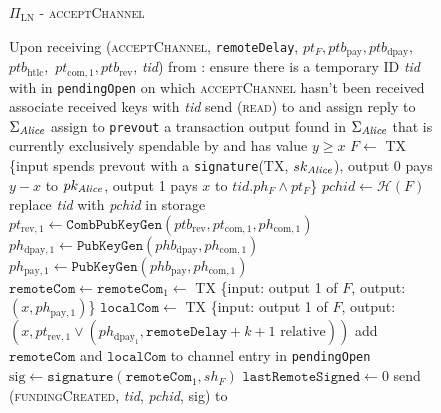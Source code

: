 \begin{figure}[!htbp]
\begin{protocolbox}{$\Pi_{\mathrm{LN}}$ - \textsc{acceptChannel}}
  \begin{algorithmic}[1]
    \State Upon receiving (\textsc{acceptChannel}, \texttt{remoteDelay}, $pt_F,
    ptb_{\mathrm{pay}}, ptb_{\mathrm{dpay}},$ $ptb_{\mathrm{htlc}},$
    $pt_{\mathrm{com}, 1}, ptb_{\mathrm{rev}}$, \textit{tid}) from \bob:
    \Indent
      \State ensure there is a temporary ID \textit{tid} with \bob{} in
      \texttt{pendingOpen} on which \textsc{acceptChannel} hasn't been received
      \State associate received keys with \textit{tid}
      \State send (\textsc{read}) to \ledger{} and assign reply to
      $\Sigma_{\mathit{Alice}}$
      \State assign to \texttt{prevout} a transaction output found in
      $\Sigma_{\mathit{Alice}}$ that is currently exclusively spendable by \alice{} and
      has value $y \geq x$
      \State $F \gets$ TX \{input spends prevout with a \texttt{signature}(TX,
      $sk_{\mathit{Alice}}$), output 0 pays $y - x$ to $pk_{\mathit{Alice}}$, output 1 pays $x$
      to $\textit{tid}.ph_F \wedge pt_F$\}
      \State $\mathit{pchid} \gets \mathcal{H}\left(F\right)$
      \State replace \textit{tid} with \textit{pchid} in storage
      \State $pt_{\mathrm{rev}, 1} \gets
      \mathtt{CombPubKeyGen}\left(ptb_{\mathrm{rev}}, pt_{\mathrm{com}, 1},
      ph_{\mathrm{com}, 1}\right)$
      \State $ph_{\mathrm{dpay}, 1} \gets
      \texttt{PubKeyGen}\left(phb_{\mathrm{dpay}}, ph_{\mathrm{com}, 1}\right)$
      \State $ph_{\mathrm{pay}, 1} \gets
      \texttt{PubKeyGen}\left(phb_{\mathrm{pay}}, ph_{\mathrm{com}, 1}\right)$
      \State $\mathtt{remoteCom} \gets \mathtt{remoteCom}_1 \gets$ TX \{input:
      output 1 of $F$, output: $\left(x, ph_{\mathrm{pay}, 1}\right)$\}
      \State $\mathtt{localCom} \gets$ TX \{input: output 1 of $F$, output:
      $\left(x, pt_{\mathrm{rev}, 1} \vee \left(ph_{\mathrm{dpay}_1},
      \mathtt{remoteDelay} + k + 1 \text{ relative}\right)\right)$
      \State add $\mathtt{remoteCom}$ and $\mathtt{localCom}$ to channel entry
      in \texttt{pendingOpen}
      \State $\mathrm{sig} \gets \mathtt{signature}\left(\mathtt{remoteCom}_1,
      sh_F\right)$
      \State $\mathtt{lastRemoteSigned} \gets 0$
      \State send (\textsc{fundingCreated}, \textit{tid},
      \textit{pchid}, sig) to \bob{}
    \EndIndent
  \end{algorithmic}
\end{protocolbox}
\caption{}
\label{alg:protocol:open:acceptChannel}
\end{figure}

